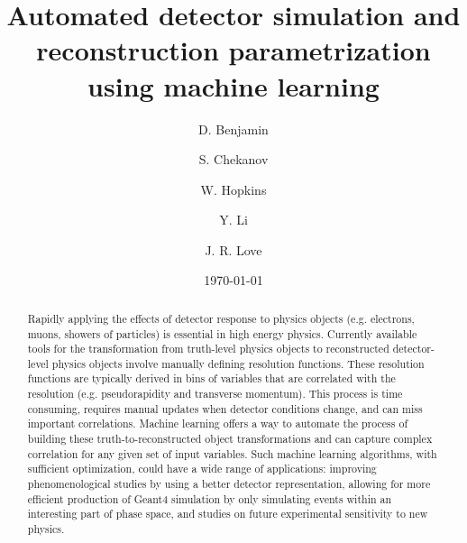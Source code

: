 \documentclass[showpacs,showkeys,preprint,prd,nofootinbib,linenumbers,12pt,superscriptaddress]{revtex4-1}
\begin{document}


\date{\today}

\vspace{2.5cm}

\title{
  Automated detector simulation and reconstruction parametrization using machine learning 
}

\author{D. Benjamin}
\author{S. Chekanov}
\author{W. Hopkins}
\author{Y. Li}
\author{J. R. Love}

\begin{abstract}
Rapidly applying the effects of detector response to physics objects (e.g. electrons, muons, showers of particles) is essential in high energy physics. Currently available tools for the transformation from truth-level physics objects to reconstructed detector-level physics objects involve manually defining resolution functions. These resolution functions are typically derived in bins of variables that are correlated with the resolution (e.g. pseudorapidity and transverse momentum). This process is time consuming, requires manual updates when detector conditions change, and can miss important correlations. Machine learning offers a way to automate the process of building these truth-to-reconstructed object transformations and can capture complex correlation for any given set of input variables. Such machine learning algorithms, with sufficient optimization, could have a wide range of applications: improving phenomenological studies by using a better detector representation, allowing for more efficient production of Geant4 simulation by only simulating events within an interesting part of phase space, and studies on future experimental sensitivity to new physics.
\end{abstract}
\end{document}
